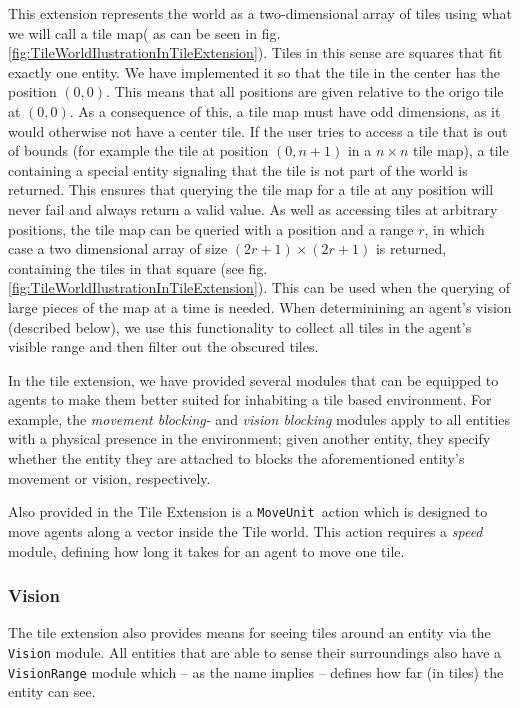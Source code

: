 This extension represents the world as a two-dimensional array of
tiles using what we will call a tile map( as can be seen in fig. \ref{fig:TileWorldIlustrationInTileExtension}).\emph{
}Tiles in this sense are squares that fit exactly one entity. We have
implemented it so that the tile in the center has the position $(0,0)$.
This means that all positions are given relative to the origo tile
at $(0,0)$. As a consequence of this, a tile map must have odd dimensions,
as it would otherwise not have a center tile. If the user tries to
access a tile that is out of bounds (for example the tile at position
$(0,n+1)$ in a $n\times n$ tile map), a tile containing a special
entity signaling that the tile is not part of the world is returned.
This ensures that querying the tile map for a tile at any position
will never fail and always return a valid value. As well as accessing
tiles at arbitrary positions, the tile map can be queried with a position
and a range $r$, in which case a two dimensional array of size $(2r+1)\times(2r+1)$
is returned, containing the tiles in that square (see fig. \ref{fig:TileWorldIlustrationInTileExtension}).
This can be used when the querying of large pieces of the map at a
time is needed. When determinining an agent's vision (described below),
we use this functionality to collect all tiles in the agent's visible
range and then filter out the obscured tiles.

In the tile extension, we have provided several modules that can be
equipped to agents to make them better suited for inhabiting a tile
based environment. For example, the \emph{movement blocking-} and
\emph{vision blocking} modules apply to all entities with a physical
presence in the environment; given another entity, they specify whether
the entity they are attached to blocks the aforementioned entity's
movement or vision, respectively. 

Also provided in the Tile Extension is a \texttt{MoveUnit }action
which is designed to move agents along a vector inside the Tile world.
This action requires a \emph{speed} module, defining how long it takes
for an agent to move one tile.


\subsubsection*{Vision}

The tile extension also provides means for seeing tiles around an
entity via the \texttt{Vision} module. All entities that are able
to sense their surroundings also have a \texttt{VisionRange} module
which -- as the name implies -- defines how far (in tiles) the entity
can see.

